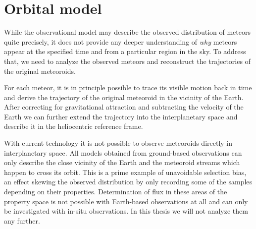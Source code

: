 %
%
%
%

\section{Orbital model} \label{mo}
    While the observational model may describe the observed distribution of meteors quite precisely,
    it does not provide any deeper understanding of \textit{why} meteors appear
    at the specified time and from a particular region in the sky.
    To address that, we need to analyze the observed meteors and reconstruct
    the trajectories of the original meteoroids.

    For each meteor, it is in principle possible to trace its visible motion back in time
    and derive the trajectory of the original meteoroid in the vicinity of the Earth.
    After correcting for gravitational attraction and subtracting the velocity of the Earth
    we can further extend the trajectory into the interplanetary space and describe it in the heliocentric reference frame.

    With current technology it is not possible to observe meteoroids directly in interplanetary space.
    All models obtained from ground-based observations can only describe the close
    vicinity of the Earth and the meteoroid streams which happen to cross its orbit.
    This is a prime example of unavoidable selection bias, an effect skewing the observed distribution
    by only recording some of the samples depending on their properties.
    Determination of flux in these areas of the property space is not possible
    with Earth-based observations at all and can only be investigated with in-situ observations.
    In this thesis we will not analyze them any further.


